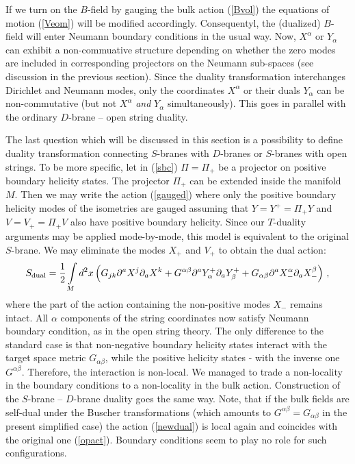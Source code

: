 \documentclass[a4paper,12pt,twoside]{article}
\begin{document}
If we turn on the $B$-field by gauging the bulk action
(\ref{Bvol}) the equations of motion (\ref{Veom}) will
be modified accordingly. Consequentyl, the (dualized)
$B$-field will enter Neumann boundary conditions in the
usual way. Now, $X^\alpha$ or $Y_\alpha$ can exhibit a
non-commuative structure depending on whether the zero
modes are included in corresponding projectors on the
Neumann sub-spaces (see discussion in the previous section).
Since the duality transformation interchanges Dirichlet and
Neumann modes, only the coordinates $X^\alpha$ or their
duals $Y_\alpha$ can be non-commutative (but not $X^\alpha$
{\it and} $Y_\alpha$ simultaneously). This goes in parallel
with the ordinary $D$-brane -- open string duality.

The last question which will be discussed in this section is
a possibility to define duality transformation connecting 
$S$-branes with $D$-branes or $S$-branes with open strings.
To be more specific,
let in (\ref{sbc}) $\Pi=\Pi_+$ be a projector on positive boundary
helicity states. The projector $\Pi_+$ can be extended inside the
manifold $M$. Then we may write the action (\ref{gauged}) where
only the positive boundary helicity modes of the
isometries are gauged assuming that $Y=Y^+=\Pi_+Y$ and $V=V_+=\Pi_+V$ 
also have positive
boundary helicity. Since our $T$-duality arguments may be applied
mode-by-mode, this model is equivalent to the original $S$-brane.
We may eliminate the modes $X_+$ and $V_+$ to obtain the dual
action:
\begin{equation}
S_{{\mbox {\scriptsize {dual}}}}=\frac 12 \int\limits_M
d^2x \left( G_{jk}\partial^a X^j \partial_a X^k +G^{\alpha\beta}
\partial^a Y_\alpha^+ \partial_a Y_\beta^+
+G_{\alpha\beta}\partial^a X^\alpha_- \partial_a X^\beta_- \right)\,, 
\label{newdual}
\end{equation}
where the part of the action containing the non-positive modes $X_-$
remains intact. All $\alpha$ components of the string coordinates
now satisfy Neumann boundary condition, as in the open string theory.
The only difference to the standard case is that non-negative
boundary helicity states interact with the target space metric
$G_{\alpha\beta}$, while the positive helicity states - with the
inverse one $G^{\alpha\beta}$. Therefore, the interaction is
non-local. We managed to trade a non-locality in the boundary
conditions to a non-locality in the bulk action. Construction of
the $S$-brane -- $D$-brane duality goes the same way. Note,
that if the bulk fields are self-dual under the Buscher transformations
\cite{Buscher:1987sk}
(which amounts to $G^{\alpha\beta}=G_{\alpha\beta}$ in the present
simplified case) the action (\ref{newdual}) is local again and
coincides with the original one (\ref{opact}). Boundary conditions
seem to play no role for such configurations.
\end{document}
